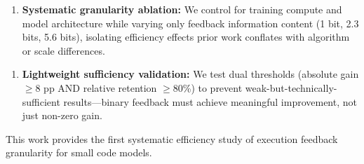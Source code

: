 \begin{enumerate}
\item \textbf{Systematic granularity ablation:} We control for training compute and model architecture while varying only feedback information content (1 bit, 2.3 bits, 5.6 bits), isolating efficiency effects prior work conflates with algorithm or scale differences.
\end{enumerate}

\begin{enumerate}
\item \textbf{Lightweight sufficiency validation:} We test dual thresholds (absolute gain $\geq 8$ pp AND relative retention $\geq 80$\%) to prevent weak-but-technically-sufficient results---binary feedback must achieve meaningful improvement, not just non-zero gain.
\end{enumerate}

This work provides the first systematic efficiency study of execution feedback granularity for small code models.
